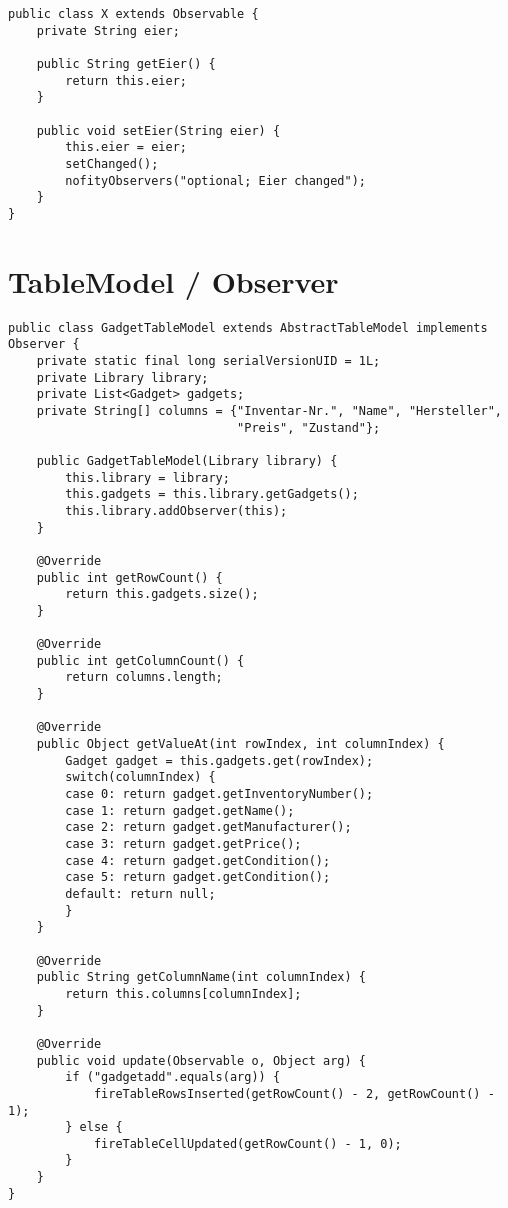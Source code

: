 \documentclass{report}
\begin{document}
\begin{lstlisting}
public class X extends Observable {
	private String eier;

	public String getEier() {
		return this.eier;
	}

	public void setEier(String eier) {
		this.eier = eier;
		setChanged();
		nofityObservers("optional; Eier changed");
	}
}

\end{lstlisting}

\newpage
\section*{TableModel / Observer}
\begin{lstlisting}
public class GadgetTableModel extends AbstractTableModel implements Observer {
	private static final long serialVersionUID = 1L;
	private Library library;
	private List<Gadget> gadgets;
	private String[] columns = {"Inventar-Nr.", "Name", "Hersteller", 
								"Preis", "Zustand"};
	
	public GadgetTableModel(Library library) {
		this.library = library;
		this.gadgets = this.library.getGadgets();
		this.library.addObserver(this);
	}
	
	@Override
	public int getRowCount() {
		return this.gadgets.size();
	}

	@Override
	public int getColumnCount() {
		return columns.length;
	}

	@Override
	public Object getValueAt(int rowIndex, int columnIndex) {
		Gadget gadget = this.gadgets.get(rowIndex);
		switch(columnIndex) {
		case 0: return gadget.getInventoryNumber();
		case 1:	return gadget.getName();
		case 2: return gadget.getManufacturer();
		case 3: return gadget.getPrice();
		case 4: return gadget.getCondition();
		case 5: return gadget.getCondition();
		default: return null;
		}
	}
	
	@Override
	public String getColumnName(int columnIndex) {
		return this.columns[columnIndex];
	}

	@Override
	public void update(Observable o, Object arg) {
		if ("gadgetadd".equals(arg)) {
			fireTableRowsInserted(getRowCount() - 2, getRowCount() - 1);
		} else {
			fireTableCellUpdated(getRowCount() - 1, 0);
		}
	}
}
\end{lstlisting}
\end{document}
